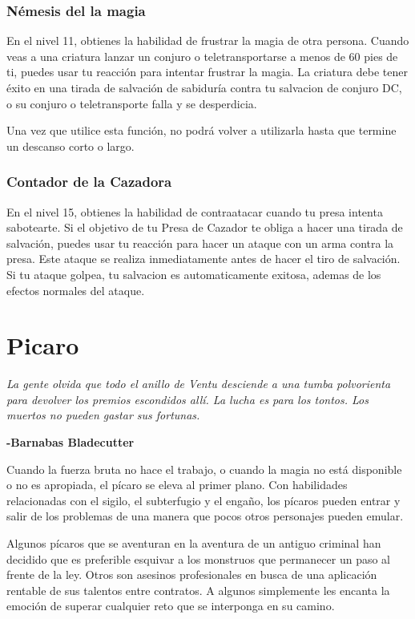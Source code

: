 \documentclass[a4paper,twocolumn,openany,10pt]{dndbook}
\begin{document}
\subsubsection{Némesis del la magia}
En el nivel 11, obtienes la habilidad de frustrar la magia de otra persona. Cuando veas a una criatura lanzar un conjuro o
teletransportarse a menos de 60 pies de ti, puedes usar tu reacción para intentar frustrar la magia.  La criatura debe tener
éxito en una tirada de salvación de sabiduría contra tu salvacion de conjuro DC, o su conjuro o teletransporte falla y se
desperdicia.

Una vez que utilice esta función, no podrá volver a utilizarla hasta que termine un descanso corto o largo.

\subsubsection{Contador de la Cazadora}

En el nivel 15, obtienes la habilidad de contraatacar cuando tu presa intenta sabotearte. Si el objetivo de tu Presa de Cazador
te obliga a hacer una tirada de salvación, puedes usar tu reacción para hacer un ataque con un arma contra la presa. Este ataque
se realiza inmediatamente antes de hacer el tiro de salvación. Si tu ataque golpea, tu salvacion es automaticamente exitosa,
ademas de los efectos normales del ataque. 

\section{Picaro}
\begin{quotebox}
	\textit{ La gente olvida que todo el anillo de Ventu desciende a una tumba polvorienta para devolver los premios escondidos
	allí. La lucha es para los tontos. Los muertos no pueden gastar sus fortunas.}

	\begin{flushright}
	\textbf{-Barnabas Bladecutter}
	\end{flushright}
\end{quotebox}

Cuando la fuerza bruta no hace el trabajo, o cuando la magia no está disponible o no es apropiada, el pícaro se eleva al primer
plano. Con habilidades relacionadas con el sigilo, el subterfugio y el engaño, los pícaros pueden entrar y salir de los
problemas de una manera que pocos otros personajes pueden emular.

Algunos pícaros que se aventuran en la aventura de un antiguo criminal han decidido que es preferible esquivar a los monstruos
que permanecer un paso al frente de la ley. Otros son asesinos profesionales en busca de una aplicación rentable de sus talentos entre contratos. A algunos simplemente les encanta la emoción de superar cualquier reto que se interponga en su camino.
\end{document}
